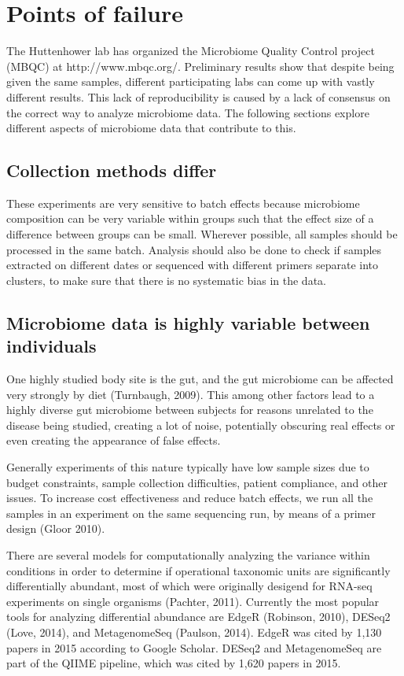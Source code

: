 \section{Points of failure}
The Huttenhower lab has organized the Microbiome Quality Control project (MBQC) at http://www.mbqc.org/. Preliminary results show that despite being given the same samples, different participating labs can come up with vastly different results. This lack of reproducibility is caused by a lack of consensus on the correct way to analyze microbiome data. The following sections explore different aspects of microbiome data that contribute to this.

\subsection{Collection methods differ}
These experiments are very sensitive to batch effects because microbiome composition can be very variable within groups such that the effect size of a difference between groups can be small. Wherever possible, all samples should be processed in the same batch. Analysis should also be done to check if samples extracted on different dates or sequenced with different primers separate into clusters, to make sure that there is no systematic bias in the data.

\subsection{Microbiome data is highly variable between individuals}
One highly studied body site is the gut, and the gut microbiome can be affected very strongly by diet (Turnbaugh, 2009). This among other factors lead to a highly diverse gut microbiome between subjects for reasons unrelated to the disease being studied, creating a lot of noise, potentially obscuring real effects or even creating the appearance of false effects.

Generally experiments of this nature typically have low sample sizes due to budget constraints, sample collection difficulties, patient compliance, and other issues. To increase cost effectiveness and reduce batch effects, we run all the samples in an experiment on the same sequencing run, by means of a primer design (Gloor 2010).

There are several models for computationally analyzing the variance within conditions in order to determine if operational taxonomic units are significantly differentially abundant, most of which were originally desigend for RNA-seq experiments on single organisms (Pachter, 2011). Currently the most popular tools for analyzing differential abundance are EdgeR (Robinson, 2010), DESeq2 (Love, 2014), and MetagenomeSeq (Paulson, 2014). EdgeR was cited by 1,130 papers in 2015 according to Google Scholar. DESeq2 and MetagenomeSeq are part of the QIIME pipeline, which was cited by 1,620 papers in 2015.

